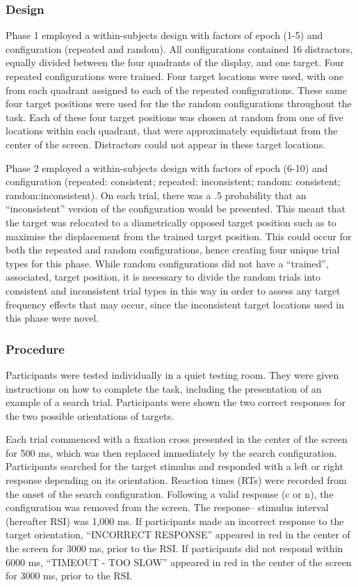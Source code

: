 \documentclass[
  man,floatsintext]{apa7}
\begin{document}
\hypertarget{design}{%
\subsubsection{Design}\label{design}}

Phase 1 employed a within-subjects design with factors of epoch (1-5) and configuration (repeated and random). All configurations contained 16 distractors, equally divided between the four quadrants of the display, and one target. Four repeated configurations were trained. Four target locations were used, with one from each quadrant assigned to each of the repeated configurations. These same four target positions were used for the the random configurations throughout the task. Each of these four target positions was chosen at random from one of five locations within each quadrant, that were approximately equidistant from the center of the screen. Distractors could not appear in these target locations.

Phase 2 employed a within-subjects design with factors of epoch (6-10) and configuration (repeated: consistent; repeated: inconsistent; random: consistent; random:inconsistent). On each trial, there was a .5 probability that an ``inconsistent'' version of the configuration would be presented. This meant that the target was relocated to a diametrically opposed target position such as to maximise the displacement from the trained target position. This could occur for both the repeated and random configurations, hence creating four unique trial types for this phase. While random configurations did not have a ``trained'', associated, target position, it is necessary to divide the random trials into consistent and inconsistent trial types in this way in order to assess any target frequency effects that may occur, since the inconsistent target locations used in this phase were novel.

\hypertarget{procedure}{%
\subsubsection{Procedure}\label{procedure}}

Participants were tested individually in a quiet testing room. They were given instructions on how to complete the task, including the presentation of an example of a search trial. Participants were shown the two correct responses for the two possible orientations of targets.

Each trial commenced with a fixation cross presented in the center of the screen for 500 ms, which was then replaced immediately by the search configuration. Participants searched for the target stimulus and responded with a left or right response depending on its orientation. Reaction times (RTs) were recorded from the onset of the search configuration. Following a valid response (c or n), the configuration was removed from the screen. The response-- stimulus interval (hereafter RSI) was 1,000 ms. If participants made an incorrect response to the target orientation, ``INCORRECT RESPONSE'' appeared in red in the center of the screen for 3000 ms, prior to the RSI. If participants did not respond within 6000 ms, ``TIMEOUT - TOO SLOW'' appeared in red in the center of the screen for 3000 ms, prior to the RSI.
\end{document}
